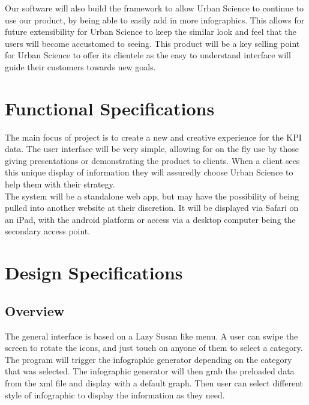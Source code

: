 \documentclass[11pt,a4paper,oneside]{article}
\begin{document}
Our software will also build the framework to allow Urban Science to continue to use our product, by being able to easily add in more infographics. This allows for future extensibility for Urban Science to keep the similar look and feel that the users will become accustomed to seeing. This product will be a key selling point for Urban Science to offer its clientele as the easy to understand interface will guide their customers towards new goals.\\


\section{Functional Specifications}

The main focus of project is to create a new and creative experience for the KPI data. The user interface will be very simple, allowing for on the fly use by those giving presentations or demonstrating the product to clients. When a client sees this unique display of information they will assuredly choose Urban Science to help them with their strategy.\\

The system will be a standalone web app, but may have the possibility of being pulled into another website at their discretion. It will be displayed via Safari on an iPad, with the android platform or access via a desktop computer being the secondary access point.\\


\section{Design Specifications}

\subsection{Overview}

The general interface is based on a Lazy Susan like menu. A user can swipe the screen to rotate the icons, and just touch on anyone of them to select a category. The program will trigger the infographic generator depending on the category that was selected. The infographic generator will then grab the preloaded data from the xml file and display with a default graph. Then user can select different style of infographic to display the information as they need.\\
\end{document}
